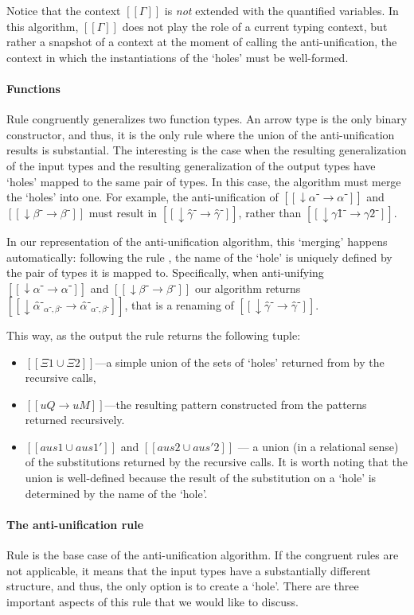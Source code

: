   Notice that the context $[[Γ]]$ is \emph{not} extended with 
  the quantified variables. In this algorithm, $[[Γ]]$ 
  does not play the role of a current typing context, but rather
  a snapshot of a context at the moment of calling the anti-unification,
  \ie the context in which the instantiations of the `holes' 
  must be well-formed.

\paragraph*{Functions}
  Rule  congruently generalizes two function types. 
  An arrow type is the only binary constructor, 
  and thus, it is the only rule where the union of the anti-unification results is substantial.
  The interesting is the case when the resulting generalization of the 
  input types and the resulting generalization of the output types 
  have `holes' mapped to the same pair of types. 
  In this case, the algorithm must merge the `holes' into one.
  For example, the anti-unification of 
  $[[↓α⁻ → α⁻]]$ and $[[↓β⁻ → β⁻]]$
  must result in $[[↓γ̂⁻ → γ̂⁻]]$,
  rather than $[[↓γ1̂⁻ → γ2̂⁻]]$.

  In our representation of the anti-unification algorithm, this `merging' happens
  automatically:
  following the rule ,
  the name of the `hole' is uniquely defined by the pair of types it is mapped to.  
  Specifically, when anti-unifying $[[↓α⁻ → α⁻]]$ and $[[↓β⁻ → β⁻]]$ our algorithm returns 
  $[[↓α̂⁻_{α⁻, β⁻} → α̂⁻_{α⁻, β⁻}]]$, that is a renaming of $[[↓γ̂⁻ → γ̂⁻]]$.

  This way, as the output the rule returns the following tuple:
  \begin{itemize}
    \item $[[Ξ1 ∪ Ξ2]]$---a simple union of the sets of `holes' 
      returned from by the recursive calls, 
    \item $[[uQ → uM]]$---the resulting pattern 
      constructed from the patterns returned recursively.
    \item $[[aus1 ∪ aus1']]$ and $[[aus2 ∪ aus'2]]$
      --- a union (in a relational sense)
      of the substitutions returned by the recursive calls. 
      It is worth noting that the union is well-defined because
      the result of the substitution on a `hole' is determined by the 
      name of the `hole'.
  \end{itemize}

\paragraph*{The anti-unification rule}
  Rule  is the base case of the anti-unification
  algorithm. If the congruent rules are not applicable, 
  it means that the input types have a substantially different structure,
  and thus, the only option is to create a `hole'. 
  There are three important aspects of this rule that we would like to discuss.

